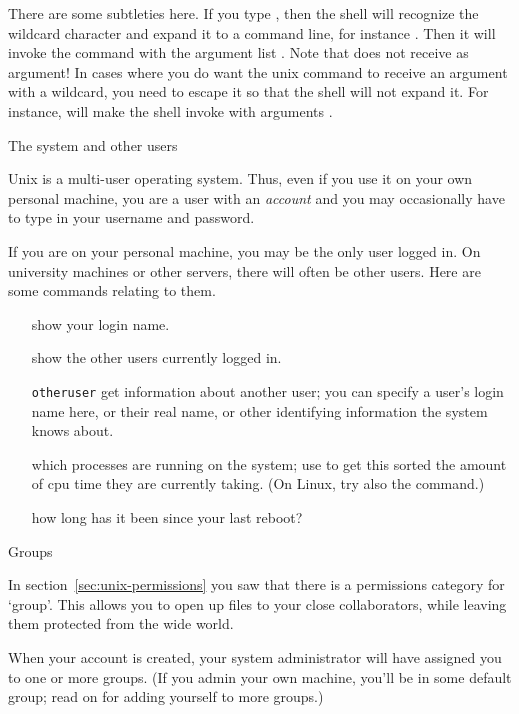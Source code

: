 There are some subtleties here. If you type , then the shell
will recognize the wildcard character and expand it to a command line,
for instance . Then it will invoke the 
command with the argument list . Note that  does
not receive  as argument! In cases where you do want the unix
command to receive an argument with a wildcard, you need to escape it
so that the shell will not expand it. For instance,  will make the shell invoke  with arguments .

 {The system and other users}
\label{sec:users}

Unix is a multi-user operating system. Thus, even if you use it
on your own personal machine, you are a user with an \emph{account}
and you may occasionally
have to type in your username and password.

If you are on your personal machine, you may be the only user logged
in. On university machines or other servers, there will often be other
users. Here are some commands relating to them.

\begin{itemize}
\item [\indextermunix{whoami}] show your login name.
\item [\indextermunix{who}] show the other users currently logged in.
\item [\indextermunix{finger} {\tt otheruser}] get information about another user;
  you can specify a user's login name here, or their real name,
  or other identifying information the system knows about.
\item [\indextermunix{top}] which processes are running on the system; use
   to get this sorted the amount of cpu time they are
  currently taking. (On Linux, try also the  command.)
\item [\indextermunix{uptime}] how long has it been since your last reboot?
\end{itemize}

 {Groups}

In section~\ref{sec:unix-permissions} you saw that there is a
permissions category for `group'. This allows you to open up files to
your close collaborators, while leaving them protected from the wide
world.

When your account is created, your system administrator will have
assigned you to one or more groups. (If you admin your own machine,
you'll be in some default group; read on for adding yourself to more groups.)

